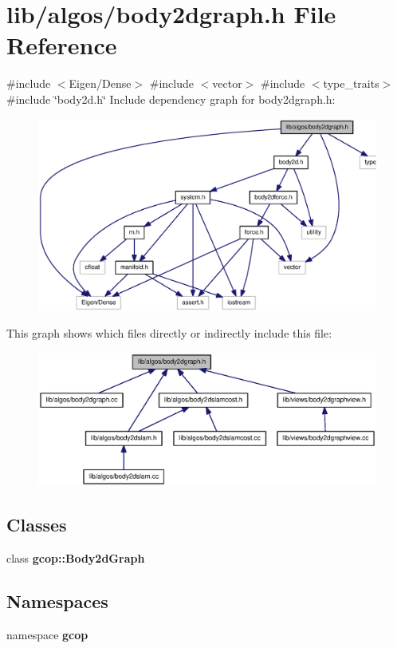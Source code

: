 \section{lib/algos/body2dgraph.h \-File \-Reference}
\label{body2dgraph_8h}
{\ttfamily \#include $<$\-Eigen/\-Dense$>$}\*
{\ttfamily \#include $<$vector$>$}\*
{\ttfamily \#include $<$type\-\_\-traits$>$}\*
{\ttfamily \#include \char`\"{}body2d.\-h\char`\"{}}\*
\-Include dependency graph for body2dgraph.\-h\-:\nopagebreak
\begin{figure}[H]
\begin{center}
\leavevmode
\includegraphics[width=350pt]{body2dgraph_8h__incl}
\end{center}
\end{figure}
\-This graph shows which files directly or indirectly include this file\-:\nopagebreak
\begin{figure}[H]
\begin{center}
\leavevmode
\includegraphics[width=350pt]{body2dgraph_8h__dep__incl}
\end{center}
\end{figure}
\subsection*{\-Classes}
\begin{DoxyCompactItemize}
\item 
class {\bf gcop\-::\-Body2d\-Graph}
\end{DoxyCompactItemize}
\subsection*{\-Namespaces}
\begin{DoxyCompactItemize}
\item 
namespace {\bf gcop}
\end{DoxyCompactItemize}
